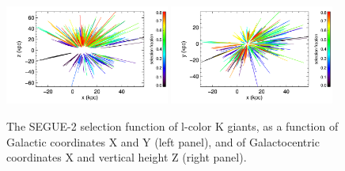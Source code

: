 \documentclass[12pt,preprint]{aastex}
\begin{document}
\begin{figure}[htbp]
\centering
\includegraphics[width=0.48\textwidth,height=0.3\textheight]{sfxzlkg}
\includegraphics[width=0.48\textwidth,height=0.3\textheight]{sfxylkg}
\caption{The SEGUE-2 selection function of l-color K giants, as a function of Galactic coordinates X and Y (left panel), and of Galactocentric coordinates X and vertical height Z (right panel).}
\label{f:flkgsf}
\end{figure}
\end{document}
